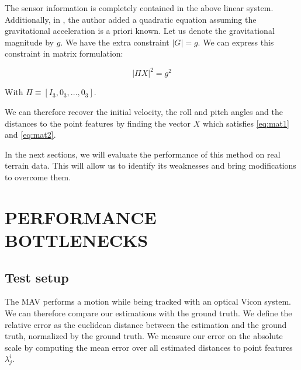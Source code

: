 \documentclass[letterpaper, 10 pt, conference]{ieeeconf}  %
\begin{document}
The sensor information is completely contained in the above linear system. Additionally, in \cite{Martinelli2014}, the author added a quadratic equation assuming the gravitational acceleration is a priori known.
Let us denote the gravitational magnitude by $g$.
We have the extra constraint $|G| = g$. We can express this constraint in matrix formulation:

\begin{equation}
\label{eq:mat2} \tag{10}
| \Pi X | ^2 = g^2
\end{equation}

With $\Pi \equiv [I_3, 0_3, ..., 0_3]$.

We can therefore recover the initial velocity, the roll and pitch angles and the distances to the point features
by finding the vector $X$ which satisfies \ref{eq:mat1} and \ref{eq:mat2}.

In the next sections, we will evaluate the performance of this method on real terrain data.
This will allow us to identify its weaknesses and bring modifications to overcome them.





\section{PERFORMANCE BOTTLENECKS}

\subsection{Test setup}

The MAV performs a motion while being tracked with an optical Vicon system.
We can therefore compare our estimations with the ground truth.
We define the relative error as the euclidean distance between the estimation and the ground truth,
normalized by the ground truth.
We measure our error on the absolute scale by computing the mean error over all estimated distances to point features $\lambda_j^i$.
\end{document}
